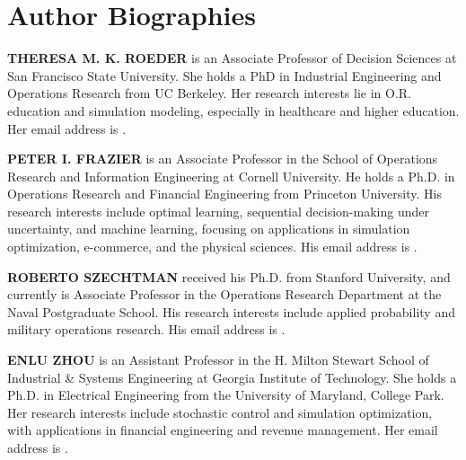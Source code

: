 \documentclass{scspaperproc}
\theoremstyle{scsthe}
\begin{document}





\section*{Author Biographies}

\textbf{\uppercase{THERESA M. K. ROEDER}} is an Associate Professor of Decision Sciences at San Francisco State University. She holds a PhD in Industrial Engineering and Operations Research from UC Berkeley. Her research interests lie in O.R. education and simulation modeling, especially in healthcare and higher education. Her email address is .

\textbf{\uppercase{PETER I. FRAZIER}} is an Associate Professor in the School of Operations Research and Information Engineering at Cornell University. He holds a Ph.D. in Operations Research and Financial Engineering from Princeton University. His research interests include optimal learning, sequential decision-making under uncertainty, and machine learning, focusing on applications in simulation optimization, e-commerce, and the physical sciences.  His email address is .

\textbf{\uppercase{ROBERTO SZECHTMAN}} received his Ph.D. from Stanford University, and currently is Associate Professor in the Operations Research Department at the Naval Postgraduate School. His research interests include applied probability and military operations research. His email address is .

\textbf{\uppercase{ENLU ZHOU}} is an Assistant Professor in the H. Milton Stewart School of Industrial \& Systems Engineering at Georgia Institute of Technology. She holds a Ph.D. in Electrical Engineering from the University of Maryland, College Park. Her research interests include stochastic control and simulation optimization, with applications in financial engineering and revenue management. Her email address is .
\end{document}
